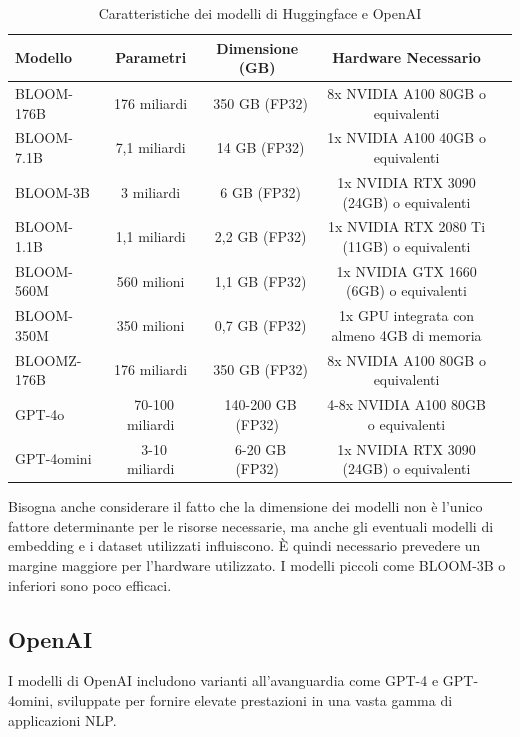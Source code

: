 \documentclass{article}
\begin{document}
\begin{table}[H]
    \centering
    \begin{tabular}{|l|c|c|c|l|}
        \hline
        \textbf{Modello} & \textbf{Parametri} & \textbf{Dimensione (GB)} & \textbf{Hardware Necessario} \\
        \hline
        BLOOM-176B & 176 miliardi & ~350 GB (FP32) & 8x NVIDIA A100 80GB o equivalenti  \\
        \hline
        BLOOM-7.1B & 7,1 miliardi & ~14 GB (FP32) & 1x NVIDIA A100 40GB o equivalenti \\
        \hline
        BLOOM-3B & 3 miliardi & ~6 GB (FP32) & 1x NVIDIA RTX 3090 (24GB) o equivalenti \\
        \hline
        BLOOM-1.1B & 1,1 miliardi & ~2,2 GB (FP32) & 1x NVIDIA RTX 2080 Ti (11GB) o equivalenti \\
        \hline
        BLOOM-560M & 560 milioni & ~1,1 GB (FP32) & 1x NVIDIA GTX 1660 (6GB) o equivalenti \\
        \hline
        BLOOM-350M & 350 milioni & ~0,7 GB (FP32) & 1x GPU integrata con almeno 4GB di memoria \\
        \hline
        BLOOMZ-176B & 176 miliardi & ~350 GB (FP32) & 8x NVIDIA A100 80GB o equivalenti \\
        \hline
        GPT-4o & ~70-100 miliardi & ~140-200 GB (FP32) & 4-8x NVIDIA A100 80GB o equivalenti \\
        \hline
        GPT-4omini & ~3-10 miliardi & ~6-20 GB (FP32) & 1x NVIDIA RTX 3090 (24GB) o equivalenti \\
        \hline
    \end{tabular}
    \caption{Caratteristiche dei modelli di Huggingface e OpenAI}
    \label{tab:modelli}
\end{table}
Bisogna anche considerare il fatto che la dimensione dei modelli non è l'unico fattore determinante per le risorse necessarie, ma anche gli eventuali modelli di embedding e i dataset utilizzati influiscono. È quindi necessario prevedere un margine maggiore per l'hardware utilizzato.
I modelli piccoli come BLOOM-3B o inferiori sono poco efficaci. 

\subsection{OpenAI}
I modelli di OpenAI includono varianti all'avanguardia come GPT-4 e GPT-4omini, sviluppate per fornire elevate prestazioni in una vasta gamma di applicazioni NLP.
\end{document}
